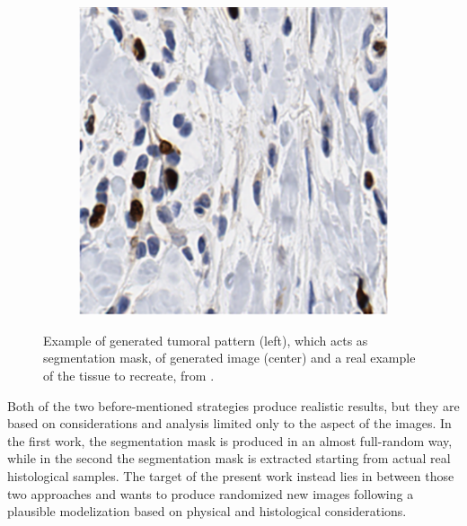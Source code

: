 \begin{figure}[t]
\begin{subfigure}[t]{0.3\textwidth}
             \caption{}
             \label{fig:cgan_model}
        \end{subfigure}
        \quad
        \begin{subfigure}[t]{0.3\textwidth}
             \centering
             \includegraphics[width = \textwidth]{images/cgan_real}
             \caption{}
             \label{fig:cgan_real}
        \end{subfigure}
        \caption{Example of generated tumoral pattern (left), which acts as segmentation mask, of generated image (center) and a real example of the tissue to recreate, from \cite{Senaras2018}.}
        \label{fig:cgan_tripl}
    \end{figure}


Both of the two before-mentioned strategies produce realistic results, but they are based on considerations and analysis limited only to the aspect of the images. In the first work, the segmentation mask is produced in an almost full-random way, while in the second the segmentation mask is extracted starting from actual real histological samples. The target of the present work instead lies in between those two approaches and wants to produce randomized new images following a plausible modelization based on physical and histological considerations.

